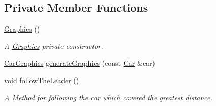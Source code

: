 \subsection*{Private Member Functions}
\begin{DoxyCompactItemize}
\item 
\hyperlink{classGraphics_af2e8fe67fd31ec263c843a6e28b29d3c}{Graphics} ()
\begin{DoxyCompactList}\small\item\em A \hyperlink{classGraphics}{Graphics} private constructor. \end{DoxyCompactList}\item 
\hyperlink{classCarGraphics}{Car\+Graphics} \hyperlink{classGraphics_a504c1b9aa359dbe8b05f8879c1045610}{generate\+Graphics} (const \hyperlink{classCar}{Car} \&car)
\item 
void \hyperlink{classGraphics_ad3718f2541f28115865058823113f5cd}{follow\+The\+Leader} ()
\begin{DoxyCompactList}\small\item\em A Method for following the car which covered the greatest distance. \end{DoxyCompactList}\end{DoxyCompactItemize}
